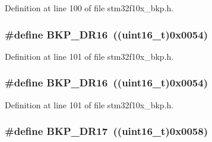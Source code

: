Definition at line 100 of file stm32f10x\+\_\+bkp.\+h.

\subsubsection[{\texorpdfstring{B\+K\+P\+\_\+\+D\+R16}{BKP_DR16}}]{\setlength{\rightskip}{0pt plus 5cm}\#define B\+K\+P\+\_\+\+D\+R16~(({\bf uint16\+\_\+t})0x0054)}\hypertarget{group___data___backup___register_ga4e12740ecfe8fcce668263c21df5492d}{}\label{group___data___backup___register_ga4e12740ecfe8fcce668263c21df5492d}


Definition at line 101 of file stm32f10x\+\_\+bkp.\+h.

\subsubsection[{\texorpdfstring{B\+K\+P\+\_\+\+D\+R16}{BKP_DR16}}]{\setlength{\rightskip}{0pt plus 5cm}\#define B\+K\+P\+\_\+\+D\+R16~(({\bf uint16\+\_\+t})0x0054)}\hypertarget{group___data___backup___register_ga4e12740ecfe8fcce668263c21df5492d}{}\label{group___data___backup___register_ga4e12740ecfe8fcce668263c21df5492d}


Definition at line 101 of file stm32f10x\+\_\+bkp.\+h.

\subsubsection[{\texorpdfstring{B\+K\+P\+\_\+\+D\+R17}{BKP_DR17}}]{\setlength{\rightskip}{0pt plus 5cm}\#define B\+K\+P\+\_\+\+D\+R17~(({\bf uint16\+\_\+t})0x0058)}\hypertarget{group___data___backup___register_ga2d7c7e1c601b0313e60d876560a34329}{}\label{group___data___backup___register_ga2d7c7e1c601b0313e60d876560a34329}


